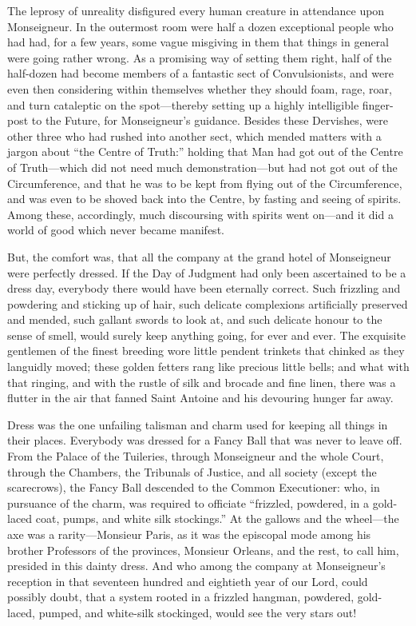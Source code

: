 The leprosy of unreality disfigured every human creature in attendance
upon Monseigneur.  In the outermost room were half a dozen exceptional
people who had had, for a few years, some vague misgiving in them
that things in general were going rather wrong.  As a promising way
of setting them right, half of the half-dozen had become members of a
fantastic sect of Convulsionists, and were even then considering within
themselves whether they should foam, rage, roar, and turn cataleptic
on the spot---thereby setting up a highly intelligible finger-post to
the Future, for Monseigneur's guidance.  Besides these Dervishes,
were other three who had rushed into another sect, which mended
matters with a jargon about ``the Centre of Truth:'' holding that Man
had got out of the Centre of Truth---which did not need much
demonstration---but had not got out of the Circumference, and that he
was to be kept from flying out of the Circumference, and was even to
be shoved back into the Centre, by fasting and seeing of spirits.
Among these, accordingly, much discoursing with spirits went on---and
it did a world of good which never became manifest.

But, the comfort was, that all the company at the grand hotel of
Monseigneur were perfectly dressed.  If the Day of Judgment had only
been ascertained to be a dress day, everybody there would have been
eternally correct.  Such frizzling and powdering and sticking up of
hair, such delicate complexions artificially preserved and mended,
such gallant swords to look at, and such delicate honour to the sense
of smell, would surely keep anything going, for ever and ever.
The exquisite gentlemen of the finest breeding wore little pendent
trinkets that chinked as they languidly moved; these golden fetters
rang like precious little bells; and what with that ringing, and with
the rustle of silk and brocade and fine linen, there was a flutter in
the air that fanned Saint Antoine and his devouring hunger far away.

Dress was the one unfailing talisman and charm used for keeping all
things in their places.  Everybody was dressed for a Fancy Ball that
was never to leave off.  From the Palace of the Tuileries, through
Monseigneur and the whole Court, through the Chambers, the Tribunals
of Justice, and all society (except the scarecrows), the Fancy Ball
descended to the Common Executioner:  who, in pursuance of the charm,
was required to officiate ``frizzled, powdered, in a gold-laced coat,
pumps, and white silk stockings.''  At the gallows and the wheel---the
axe was a rarity---Monsieur Paris, as it was the episcopal mode among
his brother Professors of the provinces, Monsieur Orleans, and the
rest, to call him, presided in this dainty dress.  And who among the
company at Monseigneur's reception in that seventeen hundred and
eightieth year of our Lord, could possibly doubt, that a system
rooted in a frizzled hangman, powdered, gold-laced, pumped, and
white-silk stockinged, would see the very stars out!

